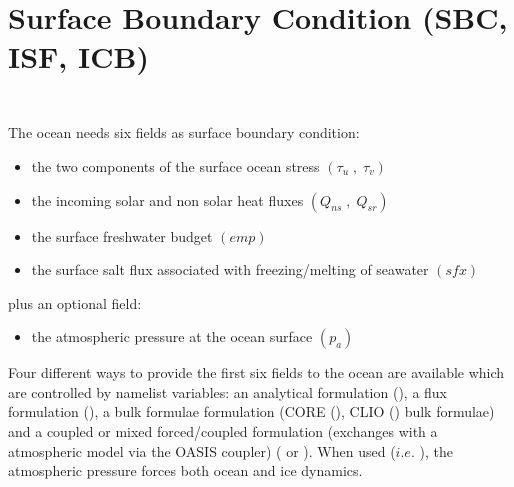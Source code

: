 \documentclass[../tex_main/NEMO_manual]{subfiles}
\begin{document}
\chapter{Surface Boundary Condition (SBC, ISF, ICB) }
\label{chap:SBC}
\minitoc

\newpage
$\ $\newline    %

$\ $\newline    %

The ocean needs six fields as surface boundary condition:
\begin{itemize}
\item
  the two components of the surface ocean stress $\left( {\tau _u \;,\;\tau _v} \right)$
\item
  the incoming solar and non solar heat fluxes $\left( {Q_{ns} \;,\;Q_{sr} } \right)$
\item
  the surface freshwater budget $\left( {\textit{emp}} \right)$
\item
  the surface salt flux associated with freezing/melting of seawater $\left( {\textit{sfx}} \right)$
\end{itemize}
plus an optional field:
\begin{itemize}
	\item the atmospheric pressure at the ocean surface $\left( p_a \right)$
\end{itemize}

Four different ways to provide the first six fields to the ocean are available which are controlled by
namelist  variables:
an analytical formulation (),
a flux formulation (),
a bulk formulae formulation (CORE (),
CLIO () bulk formulae) and
a coupled or mixed forced/coupled formulation (exchanges with a atmospheric model via the OASIS coupler)
( or ). 
When used ($i.e.$ ),
the atmospheric pressure forces both ocean and ice dynamics.
\end{document}
